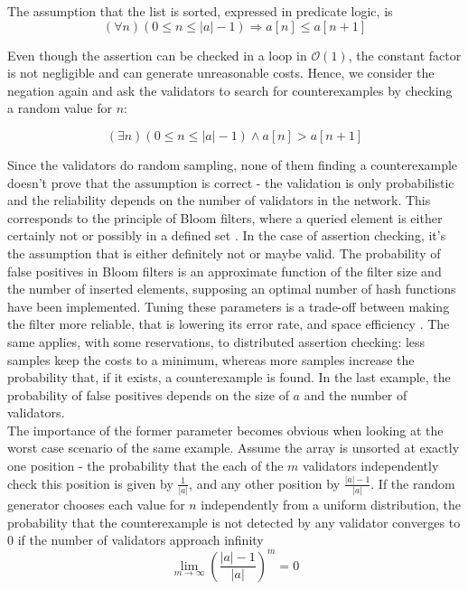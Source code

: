 The assumption that the list is sorted, expressed in predicate logic, is
\begin{equation}\label{eq:sorted}
	(\forall n) (0 \leq n \le |a| - 1) \Rightarrow a[n] \leq a[n+1]
\end{equation}

Even though the assertion can be checked in a loop in $\mathcal{O}(1)$, the constant factor is not negligible and can generate unreasonable costs. Hence, we consider the negation again and ask the validators to search for counterexamples by checking a random value for $n$:
 
\begin{equation}\label{eq:sorted_neg}
	(\exists n) (0 \leq n \le |a| - 1) \wedge a[n] > a[n+1]
\end{equation}

Since the validators do random sampling, none of them finding a counterexample doesn't prove that the assumption is correct - the validation is only probabilistic and the reliability depends on the number of validators in the network. This corresponds to the principle of Bloom filters, where a queried element is either certainly not or possibly in a defined set \cite{blustein_bloom_2002}. In the case of assertion checking, it's the assumption that is either definitely not or maybe valid. The probability of false positives in Bloom filters is an approximate function of the filter size and the number of inserted elements, supposing an optimal number of hash functions have been implemented. Tuning these parameters is a trade-off between making the filter more reliable, that is lowering its error rate, and space efficiency \cite{blustein_bloom_2002}. The same applies, with some reservations, to distributed assertion checking: less samples keep the costs to a minimum, whereas more samples increase the probability that, if it exists, a counterexample is found. In the last example, the probability of false positives depends on the size of $a$ and the number of validators.\\
The importance of the former parameter becomes obvious when looking at the worst case scenario of the same example. Assume the array is unsorted at exactly one position - the probability that the each of the $m$ validators independently check this position is given by $\frac{1}{|a|}$, and any other position by $\frac{|a|-1}{|a|}$. If the random generator chooses each value for $n$ independently from a uniform distribution, the probability that the counterexample is not detected by any validator converges to 0 if the number of validators approach infinity \cite{thiemann_2020}
\begin{equation}\label{eq:limes_validators}
	\lim_{m\to\infty} \left(\frac{|a|-1}{|a|}\right)^m = 0
\end{equation}

